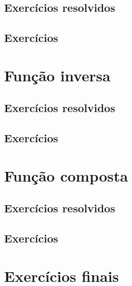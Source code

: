 \subsection*{Exercícios resolvidos}

\construirExeresol


\subsection*{Exercícios}

\construirExer


\section{Função inversa}\label{sec:intro_inversa}
\construirSec

\subsection*{Exercícios resolvidos}

\construirExeresol


\subsection*{Exercícios}

\construirExer


\section{Função composta}\label{sec:intro_composta}
\construirSec


\subsection*{Exercícios resolvidos}

\construirExeresol

\subsection*{Exercícios}

\construirExer

\section{Exercícios finais}

\construirExer
